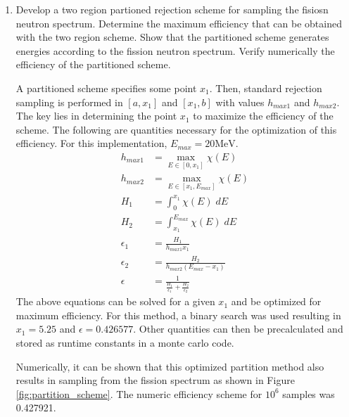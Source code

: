 \documentclass{article}
\begin{document}
\begin{enumerate}
\begin{enumerate}
      \item Develop a two region partioned rejection scheme for sampling the
        fisiosn neutron spectrum. Determine the maximum efficiency that can be
        obtained with the two region scheme. Show that the partitioned scheme
        generates energies according to the fission neutron spectrum. Verify
        numerically the efficiency of the partitioned scheme.

        A partitioned scheme specifies some point $x_1$. Then, standard
        rejection sampling is performed in $[a,x_1]$ and $[x_1,b]$ with values
        $h_{max1}$ and $h_{max2}$. The key lies in determining the point $x_1$
        to maximize the efficiency of the scheme. The following are quantities
        necessary for the optimization of this efficiency. For this
        implementation, $E_{max} = 20 \text{MeV}$. 
        \begin{align}
          h_{max1} &= \max_{E \in [0,x_1]} \chi(E) \\
          h_{max2} &= \max_{E \in [x_1,E_{max}]} \chi(E) \\
          H_1 &= \int_0^{x_1} \chi(E) \; dE \\
          H_2 &= \int_{x_1}^{E_{max}} \chi(E) \; dE \\
          \epsilon_1 &= \frac{H_1}{h_{max1} x_1} \\
          \epsilon_2 &= \frac{H_2}{h_{max2} (E_{max} - x_1)} \\
          \epsilon &= \frac{1}{\frac{H_1}{\epsilon_1} + \frac{H_2}{\epsilon_2}}
        \end{align}
        The above equations can be solved for a given $x_1$ and be optimized for
        maximum efficiency. For this method, a binary search was used resulting
        in $x_1 = 5.25$ and $\epsilon = 0.426577$. Other quantities can then be
        precalculated and stored as runtime constants in a monte carlo code. 

        Numerically, it can be shown that this optimized partition method also
        results in sampling from the fission spectrum as shown in Figure
        \ref{fig:partition_scheme}. The numeric efficiency scheme for $10^6$
        samples was 0.427921.


\end{enumerate}
\end{enumerate}
\end{document}
